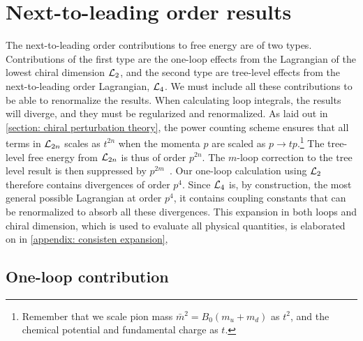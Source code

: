\section{Next-to-leading order results}
\label{section: nlo thermodynamics}


The next-to-leading order contributions to free energy are of two types.
Contributions of the first type are the one-loop effects from the Lagrangian of the lowest chiral dimension $\mathcal{L}_2$, and the second type are tree-level effects from the next-to-leading order Lagrangian, $\mathcal{L}_4$.
We must include all these contributions to be able to renormalize the results.
When calculating loop integrals, the results will diverge, and they must be regularized and renormalized.
As laid out in \autoref{section: chiral perturbation theory}, the power counting scheme ensures that all terms in $\mathcal{L}_{2n}$ scales as $t^{2n}$ when the momenta $p$ are scaled as  $p \rightarrow t p$.\footnote{
    Remember that we scale pion mass $\bar m^2 = B_0(m_u + m_d)$ as $t^2$, and the chemical potential and fundamental charge as $t$.
    }
The tree-level free energy from $\mathcal{L}_{2n}$ is thus of order $p^{2n}$.
The $m$-loop correction to the tree level result is then suppressed by $p^{2m}$~\autocite{gasserChiralPerturbationTheory1984,weinbergPhenomenologicalLagrangians1979a}.
Our one-loop calculation using $\mathcal{L}_2$ therefore contains divergences of order $p^{4}$. 
Since $\mathcal{L}_4$ is, by construction, the most general possible Lagrangian at order $p^4$, it contains coupling constants that can be renormalized to absorb all these divergences.
This expansion in both loops and chiral dimension, which is used to evaluate all physical quantities, is elaborated on in \autoref{appendix: consisten expansion},


\subsection{One-loop contribution}

